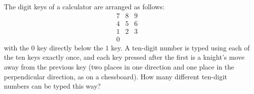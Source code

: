 The digit keys of a calculator are arranged as follows:
\[\begin{array}{ccc}7&8&9\\4&5&6\\1&2&3\\0&&\end{array}\]
with the $0$ key directly below the $1$ key. A ten-digit number is typed using each of the ten keys exactly once, and each key pressed after the first is a knight's move away from the previous key (two places in one direction and one place in the perpendicular direction, as on a chessboard). How many different ten-digit numbers can be typed this way?

